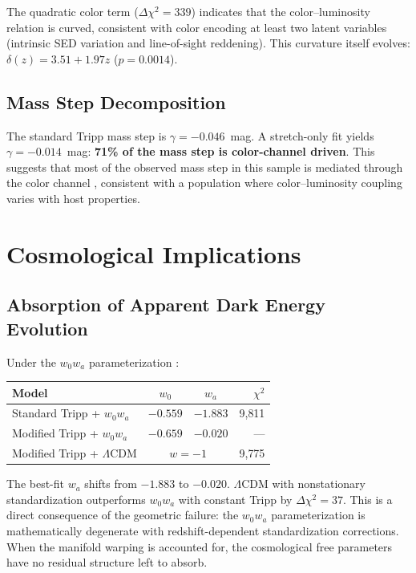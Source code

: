 \documentclass[twocolumn,showpacs,preprintnumbers,amsmath,amssymb,prl]{revtex4-2}
\begin{document}
The quadratic color term ($\Delta\chi^2 = 339$) indicates that the color--luminosity relation is curved, consistent with color encoding at least two latent variables (intrinsic SED variation and line-of-sight reddening). This curvature itself evolves: $\delta(z) = 3.51 + 1.97z$ ($p = 0.0014$).

\subsection{Mass Step Decomposition}

The standard Tripp mass step is $\gamma = -0.046$~mag. A stretch-only fit yields $\gamma = -0.014$~mag: \textbf{71\% of the mass step is color-channel driven}. This suggests that most of the observed mass step in this sample is mediated through the color channel \citep{Kelly2010,Sullivan2010,Childress2014}, consistent with a population where color--luminosity coupling varies with host properties.

\section{Cosmological Implications}
\label{sec:cosmology}

\subsection{Absorption of Apparent Dark Energy Evolution}

Under the $w_0 w_a$ parameterization \citep{Chevallier2001,Linder2003}:

\begin{center}
\begin{tabular}{lccr}
\hline\hline
Model & $w_0$ & $w_a$ & $\chi^2$ \\
\hline
Standard Tripp + $w_0 w_a$ & $-0.559$ & $-1.883$ & 9{,}811 \\
Modified Tripp + $w_0 w_a$ & $-0.659$ & $-0.020$ & --- \\
Modified Tripp + $\Lambda$CDM & \multicolumn{2}{c}{$w = -1$} & 9{,}775 \\
\hline\hline
\end{tabular}
\end{center}

The best-fit $w_a$ shifts from $-1.883$ to $-0.020$. $\Lambda$CDM with nonstationary standardization outperforms $w_0 w_a$ with constant Tripp by $\Delta\chi^2 = 37$. This is a direct consequence of the geometric failure: the $w_0 w_a$ parameterization is mathematically degenerate with redshift-dependent standardization corrections. When the manifold warping is accounted for, the cosmological free parameters have no residual structure left to absorb.
\end{document}
